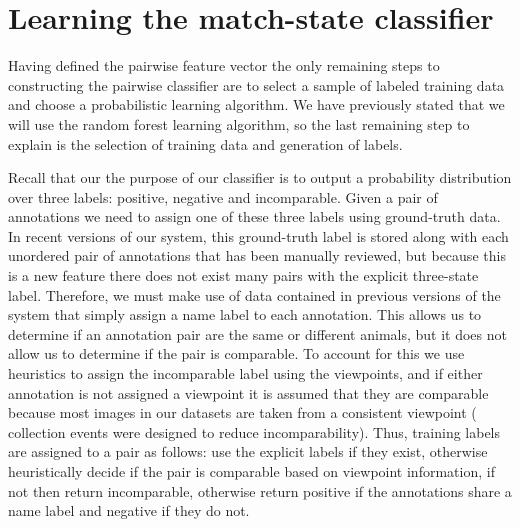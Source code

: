 

\section{Learning the match-state classifier}\label{sec:learnclf}

Having defined the pairwise feature vector the only remaining steps to constructing the pairwise classifier are
  to select a sample of labeled training data and choose a probabilistic learning algorithm.
We have previously stated that we will use the random forest learning algorithm, so the last remaining step to
  explain is the selection of training data and generation of labels.

Recall that our the purpose of our classifier is to output a probability distribution over three labels:
positive, negative and incomparable.
Given a pair of annotations we need to assign one of these three labels using ground-truth data.
In recent versions of our system, this ground-truth label is stored along with each unordered pair of annotations
  that has been manually reviewed, but because this is a new feature there does not exist many pairs with the
  explicit three-state label.
Therefore, we must make use of data contained in previous versions of the system that simply assign a name label
  to each annotation.
This allows us to determine if an annotation pair are the same or different animals, but it does not allow us to
  determine if the pair is comparable.
To account for this we use heuristics to assign the incomparable label using the viewpoints, and if either
  annotation is not assigned a viewpoint it is assumed that they are comparable because most images in our datasets
  are taken from a consistent viewpoint (\ie{} collection events were designed to reduce incomparability).
Thus, training labels are assigned to a pair as follows:
use the explicit labels if they exist, otherwise heuristically decide if the pair is comparable based on
  viewpoint information, if not then return incomparable, otherwise return positive if the annotations share a name
  label and negative if they do not.



